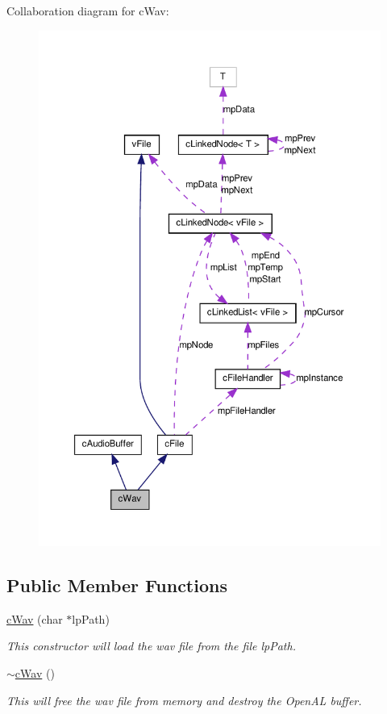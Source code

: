Collaboration diagram for cWav:
\nopagebreak
\begin{figure}[H]
\begin{center}
\leavevmode
\includegraphics[width=374pt]{classc_wav__coll__graph}
\end{center}
\end{figure}
\subsection*{Public Member Functions}
\begin{DoxyCompactItemize}
\item 
\hyperlink{classc_wav_a1093e4172a5339d3142b44152b6f1600}{cWav} (char $\ast$lpPath)
\begin{DoxyCompactList}\small\item\em This constructor will load the wav file from the file lpPath. \item\end{DoxyCompactList}\item 
\hyperlink{classc_wav_a871e6bb68160caeafba970fdf44963f9}{$\sim$cWav} ()
\begin{DoxyCompactList}\small\item\em This will free the wav file from memory and destroy the OpenAL buffer. \item\end{DoxyCompactList}\end{DoxyCompactItemize}


